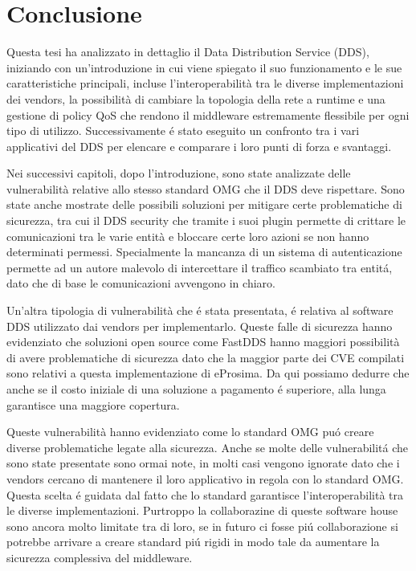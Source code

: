 \chapter{Conclusione}
Questa tesi ha analizzato in dettaglio il Data Distribution Service (DDS),
iniziando con un'introduzione in cui viene spiegato il suo funzionamento 
e le sue caratteristiche principali, incluse l'interoperabilità tra 
le diverse implementazioni dei vendors, la possibilità di 
cambiare la topologia della rete a runtime e una gestione di policy 
QoS che rendono il middleware estremamente flessibile per ogni tipo 
di utilizzo. Successivamente é stato eseguito un confronto tra i 
vari applicativi del DDS per elencare e comparare i loro 
punti di forza e svantaggi.

Nei successivi capitoli, dopo l'introduzione, sono state 
analizzate 
delle vulnerabilità relative allo stesso standard OMG che il 
DDS deve rispettare. Sono state anche mostrate delle
possibili soluzioni per mitigare certe problematiche di
sicurezza, tra cui il DDS security che tramite i suoi plugin 
permette di crittare le comunicazioni tra le varie entità e 
bloccare certe loro azioni se non hanno determinati permessi.
Specialmente la mancanza di un sistema di autenticazione 
permette ad un autore malevolo di intercettare 
il traffico scambiato tra entitá, dato che di base le 
comunicazioni avvengono in chiaro.  

Un'altra tipologia di vulnerabilità che é stata presentata, é 
relativa al software DDS utilizzato dai vendors per 
implementarlo. Queste falle di sicurezza hanno evidenziato che 
soluzioni open source come FastDDS hanno maggiori possibilità 
di avere problematiche di sicurezza dato che
la maggior parte dei CVE compilati sono relativi a questa 
implementazione di eProsima. Da qui possiamo dedurre che 
anche se il costo iniziale di una soluzione a pagamento 
é superiore, alla lunga garantisce una maggiore copertura.

Queste vulnerabilità hanno
evidenziato 
come lo standard OMG puó creare diverse problematiche 
legate alla sicurezza. 
Anche se molte delle vulnerabilitá che sono state presentate 
sono ormai note, in molti casi vengono ignorate 
dato che i vendors cercano di mantenere il loro applicativo 
in regola con lo standard OMG. Questa scelta é guidata dal fatto che 
lo standard garantisce l'interoperabilità tra le diverse implementazioni. 
Purtroppo la collaborazine di queste software house sono ancora 
molto limitate tra di loro, se in futuro ci fosse piú collaborazione 
si potrebbe arrivare a creare standard piú rigidi in modo tale
da aumentare la sicurezza complessiva del middleware.

